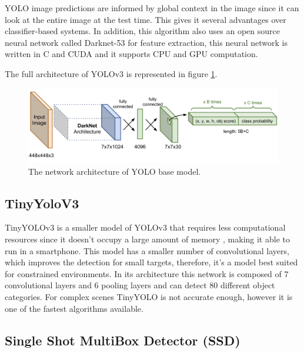     \newpage
    \par YOLO image predictions are informed by global context in the image since it can look at the entire image at the test time. This gives it several advantages over classifier-based systems. In addition, this algorithm also uses an open source neural network called Darknet-53 for feature extraction, this neural network is written in C and CUDA and it supports CPU and GPU computation. \cite{Redmon2018}\par 
    \par The full architecture of YOLOv3 is represented in figure \ref{fig:yolov3}.

    \begin{figure}[htb]
        \centering
        \includegraphics[scale = 0.26]{Sections/2StateOfTheArt/2_images/yolo-network-architecture.png}
        \caption{The network architecture of YOLO base model.\cite{weng2018detection4} }
        \label{fig:yolov3} 
    \end{figure}

    

   


    \subsection{TinyYoloV3}

    TinyYOLOv3 is a smaller model of YOLOv3 that requires less computational resources since it doesn’t occupy a large amount of memory , making it able to run in a smartphone. This model has a smaller number of convolutional layers, which improves the detection for small targets, therefore, it’s a model best suited for constrained environments. In its architecture this network is composed of 7 convolutional layers and 6 pooling layers and can detect 80 different object categories.  For complex scenes TinyYOLO is not accurate enough, however it is one of the fastest algorithms available. \cite{Yi2019}


    \subsection{Single Shot MultiBox Detector (SSD)}

